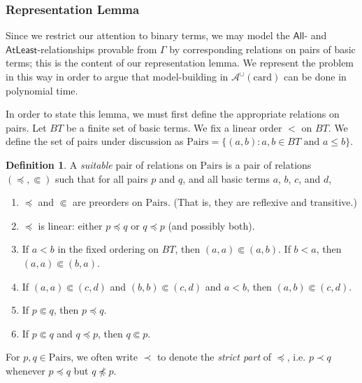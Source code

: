 \documentclass[letterpaper]{article}
\theoremstyle{definition}
\newtheorem{definition}[theorem]{Definition}
\newcommand{\set}[1]{\{ #1 \}}
\newcommand{\quadiff}{\quad \mbox{ iff } \quad}
\newcommand{\Aunion}{\mathscr{A}^{\cup}}
\newcommand{\AllNoArgs}{\mathsf{All}}
\newcommand{\AtleastNoArgs}{\mathsf{AtLeast}}
\newcommand{\card}{\mathrm{card}}
\newcommand{\Pairs}{\mbox{Pairs}}
\newcommand{\precsubseteq}{\Subset}
\newcommand{\suitable}{suitable}%
\begin{document}
\subsubsection{Representation Lemma}
\label{subsection-representation}

Since we restrict our attention to binary terms, we may model the $\AllNoArgs$- and $\AtleastNoArgs$-relationships provable from $\Gamma$ by corresponding relations on pairs of basic terms; this is the content of our representation lemma.  We represent the problem in this way in order to argue that model-building in $\Aunion(\card)$ can be done in polynomial time.

In order to state this lemma, we must first define the appropriate relations on pairs.
Let $BT$ be a finite set of basic terms.  We fix a linear order $<$ on $BT$.
We define the set of pairs under discussion as $\Pairs = \set{(a, b) : a, b \in BT \textrm{ and } a \leq b}$.

\begin{definition}
A \emph{\suitable}
pair of relations on $\Pairs$ 
is a pair of relations $(\preceq, \precsubseteq)$ such that for all pairs $p$ and $q$, and all basic terms $a$, $b$, $c$, and $d$,

\begin{enumerate}
\item $\preceq$ and $\precsubseteq$ are preorders on $\Pairs$.
(That is, they are reflexive and transitive.)
\item   $\preceq$ is linear:
 either $p \preceq q$ or $q \preceq p$ (and possibly both).
 \item If $a < b$ in the fixed ordering on $BT$, then $(a,a) \precsubseteq (a,b)$.  If $b < a$, then $(a,a) \precsubseteq (b,a)$. 
 \item If $(a,a) \precsubseteq (c,d)$ and $(b,b) \precsubseteq (c,d)$ and $a < b$,
 then $(a,b) \precsubseteq (c,d)$.
\item If $p \precsubseteq q$, then $p\preceq q$.
\item If $p \precsubseteq q$ and $q\preceq p$, then $q \precsubseteq p$.
\end{enumerate}


For $p,q \in \Pairs$, we often write $\prec$ to denote the \emph{strict part} of $\preceq$, i.e. $p \prec q$ whenever $p \preceq q$ but $q \not \preceq p$.
\label{def-suitable-pair-first}
\end{definition}
\end{document}
